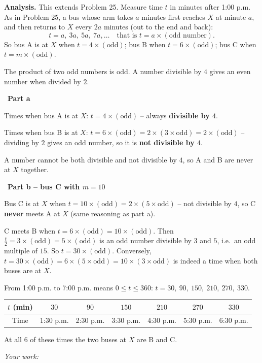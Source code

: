 \documentclass[11pt]{article}
\newif\ifsol \solfalse
\newcommand{\StuProb}[2]{\begin{probboxS}{#1}{#2}\StuProbBody\end{probboxS}}
\newcommand{\probsol}[1]{%
  \begin{lrbox}{\solmeasure}\begin{minipage}{\dimexpr\linewidth-24pt\relax}#1\end{minipage}\end{lrbox}%
  \ifsol
    \begin{solbox}#1\end{solbox}%
  \else
    \setlength{\solht}{\dimexpr\ht\solmeasure+\dp\solmeasure+0.85cm\relax}%
    \ifdim\solht<1.35cm\setlength{\solht}{1.35cm}\fi
    \ifdim\solht>\StudentMaxWork\setlength{\solht}{\StudentMaxWork}\fi
    \par\noindent\begin{minipage}{\linewidth}%
    \expandafter\StuProb\StuProbArgs
    \begin{tcolorbox}[colback=white,colframe=Line,boxrule=0.8pt,arc=5pt,
      left=8pt,right=8pt,top=4pt,bottom=4pt,height=\solht]{\footnotesize\color{Slate}\itshape\WorkWord}\end{tcolorbox}%
    \end{minipage}\par\medskip
  \fi}
\newlength{\StudentMaxWork}\setlength{\StudentMaxWork}{4.5cm}
\newcommand{\step}[2]{\par\smallskip\noindent{\bfseries\color{tmBlue!85!black}\StepWord~#1.}\ {\bfseries #2}\par\nopagebreak}
\def\WorkWord{Your work:}
\def\StepWord{Step}
\begin{document}
\probsol{
\textbf{Analysis.} This extends Problem 25. Measure time $t$ in minutes after 1:00 p.m. As in Problem 25, a bus whose arm takes $a$ minutes first reaches $X$ at minute $a$, and then returns to $X$ every $2a$ minutes (out to the end and back):
\[ t=a,\ 3a,\ 5a,\ 7a,\dots \quad\text{that is } t=a\times(\text{odd number}). \]
So bus A is at $X$ when $t=4\times(\text{odd})$; bus B when $t=6\times(\text{odd})$; bus C when $t=m\times(\text{odd})$.
\begin{recallbox}The product of two odd numbers is odd. A number divisible by $4$ gives an even number when divided by $2$.\end{recallbox}

\step{1}{Part a}
Times when bus A is at $X$: $t=4\times(\text{odd})$ -- always \textbf{divisible by $4$}.\par
Times when bus B is at $X$: $t=6\times(\text{odd})=2\times(3\times\text{odd})=2\times(\text{odd})$ -- dividing by $2$ gives an odd number, so it is \textbf{not divisible by $4$}.\par
A number cannot be both divisible and not divisible by $4$, so A and B are never at $X$ together.

\step{2}{Part b -- bus C with $m=10$}
Bus C is at $X$ when $t=10\times(\text{odd})=2\times(5\times\text{odd})$ -- not divisible by $4$, so C \textbf{never} meets A at $X$ (same reasoning as part a).\par
C meets B when $t=6\times(\text{odd})=10\times(\text{odd})$. Then $\frac{t}{2}=3\times(\text{odd})=5\times(\text{odd})$ is an odd number divisible by $3$ and $5$, i.e.\ an odd multiple of $15$. So $t=30\times(\text{odd})$. Conversely, $t=30\times(\text{odd})=6\times(5\times\text{odd})=10\times(3\times\text{odd})$ is indeed a time when both buses are at $X$.\par
From 1:00 p.m. to 7:00 p.m. means $0\le t\le 360$: $t=30,\ 90,\ 150,\ 210,\ 270,\ 330$.
\begin{center}
\begin{tabular}{|c|c|c|c|c|c|c|}
\hline
\rowcolor{tmBlue!10}$t$ (min) & $30$ & $90$ & $150$ & $210$ & $270$ & $330$\\ \hline
Time & 1:30 p.m. & 2:30 p.m. & 3:30 p.m. & 4:30 p.m. & 5:30 p.m. & 6:30 p.m.\\ \hline
\end{tabular}
\end{center}
At all $6$ of these times the two buses at $X$ are B and C.

}
\end{document}
